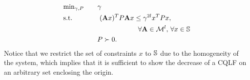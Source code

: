 \begin{equation}\label{eqn:campiOpt2}
\begin{aligned}
&\text{min}_{\gamma, P} \qquad \gamma \\
&\text{s.t.} \qquad \qquad (\mathbf{A} x)^T P \mathbf{A} x \leq \gamma^{2l} x^T P x,\\
&\qquad \qquad \qquad \qquad \qquad \quad \forall \mathbf{A} \in \mathcal{M}^l, \,\forall x \in \mathbb{S}\\
&\qquad  \qquad \quad P \succ 0.
\end{aligned}
\end{equation}
Notice that we restrict the set of constraints $x$ to $\mathbb{S}$ due to the homogeneity of the system, which implies that it is sufficient to show the decrease of a CQLF on an arbitrary set enclosing the origin.